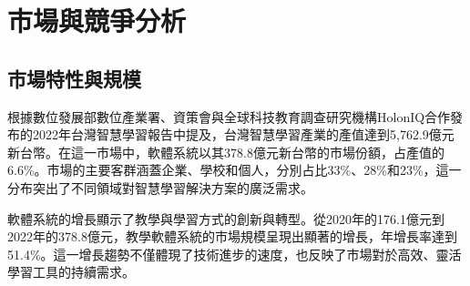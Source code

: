 \section{市場與競爭分析}

\subsection{市場特性與規模}

根據數位發展部數位產業署、資策會與全球科技教育調查研究機構HolonIQ合作發布的2022年台灣智慧學習報告中提及，台灣智慧學習產業的產值達到5,762.9億元新台幣。在這一市場中，軟體系統以其378.8億元新台幣的市場份額，占產值的6.6\%。市場的主要客群涵蓋企業、學校和個人，分別占比33\%、28\%和23\%，這一分布突出了不同領域對智慧學習解決方案的廣泛需求。

軟體系統的增長顯示了教學與學習方式的創新與轉型。從2020年的176.1億元到2022年的378.8億元，教學軟體系統的市場規模呈現出顯著的增長，年增長率達到51.4\%。這一增長趨勢不僅體現了技術進步的速度，也反映了市場對於高效、靈活學習工具的持續需求。





